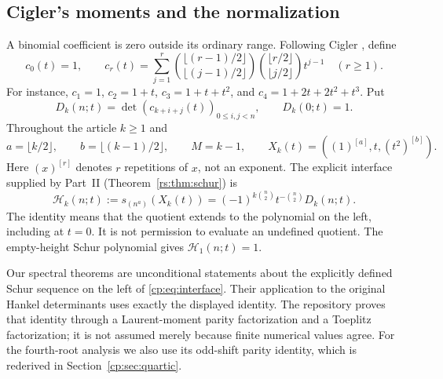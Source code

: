 \documentclass[11pt]{article}
\theoremstyle{definition}
\theoremstyle{remark}
\newcommand{\Ht}{\mathcal H}
\newcommand{\rep}[2]{(#1)^{[#2]}}
\theoremstyle{definition}
\theoremstyle{plain}
\numberwithin{equation}{section}
\begin{document}

\subsection{Cigler's moments and the normalization}
A binomial coefficient is zero outside its ordinary range. Following
Cigler \cite{Cigler}, define
\begin{equation}
 c_0(t)=1,\qquad
 c_r(t)=\sum_{j=1}^{r}
 \binom{\lfloor(r-1)/2\rfloor}{\lfloor(j-1)/2\rfloor}
 \binom{\lfloor r/2\rfloor}{\lfloor j/2\rfloor}t^{j-1}
 \quad(r\ge1).
 \label{cp:eq:moments}
\end{equation}
For instance, $c_1=1$, $c_2=1+t$, $c_3=1+t+t^2$, and
$c_4=1+2t+2t^2+t^3$. Put
\begin{equation}
 D_k(n;t)=\det(c_{k+i+j}(t))_{0\le i,j<n},\qquad D_k(0;t)=1.
 \label{cp:eq:hankel}
\end{equation}
Throughout the article $k\ge1$ and
\begin{equation}
 a=\lfloor k/2\rfloor,\qquad b=\lfloor(k-1)/2\rfloor,
 \qquad M=k-1,\qquad X_k(t)=(\rep1a,t,\rep{t^2}b).
 \label{cp:eq:alphabet}
\end{equation}
Here $\rep{x}{r}$ denotes $r$ repetitions of $x$, not an exponent.
The explicit interface supplied by Part~II (Theorem~\ref{rs:thm:schur}) is
\begin{equation}
 \boxed{\quad
 \Ht_k(n;t):=s_{(n^a)}(X_k(t))
 =(-1)^{k\binom n2}t^{-\binom n2}D_k(n;t).
 \quad}
 \label{cp:eq:interface}
\end{equation}
The identity means that the quotient extends to the polynomial on the left,
including at $t=0$. It is not permission to evaluate an undefined quotient.
The empty-height Schur polynomial gives $\Ht_1(n;t)=1$.

Our spectral theorems are unconditional statements about the explicitly
defined Schur sequence on the left of \eqref{cp:eq:interface}. Their application
to the original Hankel determinants uses exactly the displayed identity.
The repository proves that identity through a Laurent-moment parity
factorization and a Toeplitz factorization; it is not assumed merely because
finite numerical values agree. For the fourth-root analysis we also use its
odd-shift parity identity, which is rederived in Section~\ref{cp:sec:quartic}.
\end{document}
